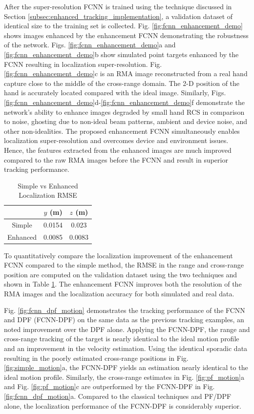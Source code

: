 \documentclass[10pt,journal,final]{IEEEtran}
\begin{document}
After the super-resolution FCNN is trained using the technique discussed in Section \ref{subsec:enhanced_tracking_implementation}, a validation dataset of identical size to the training set is collected.
Fig. \ref{fig:fcnn_enhancement_demo} shows images enhanced by the enhancement FCNN demonstrating the robustness of the network. 
Figs. \ref{fig:fcnn_enhancement_demo}a and \ref{fig:fcnn_enhancement_demo}b show simulated point targets enhanced by the FCNN resulting in localization super-resolution. 
Fig. \ref{fig:fcnn_enhancement_demo}c is an RMA image reconstructed from a real hand capture close to the middle of the cross-range domain. 
The 2-D position of the hand is accurately located compared with the ideal image. 
Similarly, Figs. \ref{fig:fcnn_enhancement_demo}d-\ref{fig:fcnn_enhancement_demo}f demonstrate the network's ability to enhance images degraded by small hand RCS in comparison to noise, ghosting due to non-ideal beam patterns, ambient and device noise, and other non-idealities.
The proposed enhancement FCNN simultaneously enables localization super-resolution and overcomes device and environment issues.
Hence, the features extracted from the enhanced images are much improved compared to the raw RMA images before the FCNN and result in superior tracking performance.

\begin{table} [h]
	\caption{Simple vs Enhanced Localization RMSE}
	\centering
	\begin{tabular}{| c || c |  c |}
		\hline
		& $y$ (m) & $z$ (m) \\
		\hline\hline
		Simple & 0.0154 & 0.023 \\ 
		\hline
		Enhanced & 0.0085 & 0.0083 \\ 
		\hline
	\end{tabular}
	\label{table:fcnn_position_rmse}
\end{table}

To quantitatively compare the localization improvement of the enhancement FCNN compared to the simple method, the RMSE in the range and cross-range position are computed on the validation dataset using the two techniques and shown in Table \ref{table:fcnn_position_rmse}. 
The enhancement FCNN improves both the resolution of the RMA images and the localization accuracy for both simulated and real data. 

Fig. \ref{fig:fcnn_dpf_motion} demonstrates the tracking performance of the FCNN and DPF (FCNN-DPF) on the same data as the previous tracking examples, an noted improvement over the DPF alone. 
Applying the FCNN-DPF, the range and cross-range tracking of the target is nearly identical to the ideal motion profile and an improvement in the velocity estimation.
Using the identical sporadic data resulting in the poorly estimated cross-range positions in Fig. \ref{fig:simple_motion}a, the FCNN-DPF yields an estimation nearly identical to the ideal motion profile.
Similarly, the cross-range estimates in Fig. \ref{fig:pf_motion}a and Fig. \ref{fig:pf_motion}c are outperformed by the FCNN-DPF in Fig. \ref{fig:fcnn_dpf_motion}a.
Compared to the classical techniques and PF/DPF alone, the localization performance of the FCNN-DPF is considerably superior.
\end{document}
